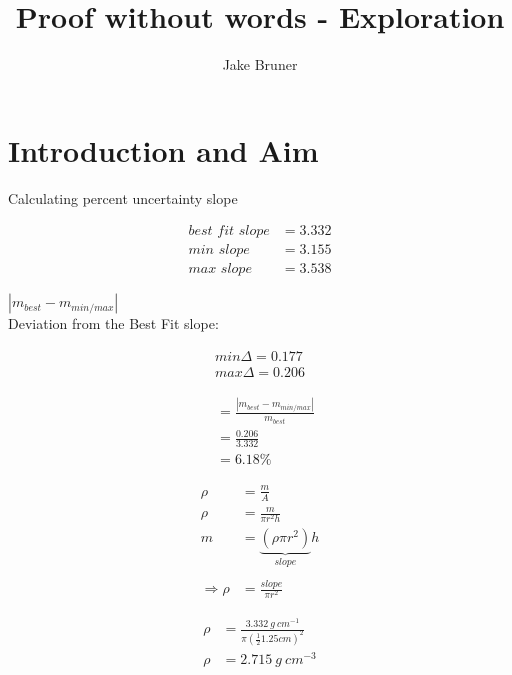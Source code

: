 \documentclass[11pt,a4paper]{article}
\author{Jake Bruner}
\title{Proof without words - Exploration}
\begin{document}
\maketitle
\tableofcontents
\pagebreak

\section{Introduction and Aim}

Calculating percent uncertainty slope

\begin{align*}
\textit{best fit slope} &= 3.332 \\
\textit{min slope} &= 3.155 \\
\textit{max slope} &= 3.538 
\end{align*}


$|m_{best} - m_{min/max}|$\\


Deviation from the Best Fit slope:

\begin{align*}
min \Delta = 0.177 \\
max \Delta = 0.206
\end{align*}

\begin{align*}
&=\frac{|m_{best} - m_{min/max}|}{m_{best}}\\
&=\frac{0.206}{3.332}\\
&= 6.18 \%
\end{align*}

\begin{align*}
\rho &= \frac{m}{A}\\
\rho &= \frac{m}{\pi r^2 h}\\
m &= \underbrace{(\rho \pi r^2)}_{slope} h \\ \\
\Rightarrow \rho &= \frac{slope}{\pi r^2}
\end{align*}

\begin{align*}
\rho &= \frac{3.332\ g\  cm^{-1}}{\pi(\frac{1}{2}1.25cm)^2}\\
\rho &= 2.715\ g\ cm^{-3}
\end{align*}

\iffalse
\pagebreak
\section{Understanding Proof Through Pythagoras}
\subsection{The First Proof \textit{circa} 200 BCE}
\begin{figure}[h]
\begin{center}
\texttt{[image: proof of pt]} 
\caption{Proof of Pythagorean Theorem circa \textit{200 BC}}
\end{center}
\end{figure}
\fi
\end{document}
